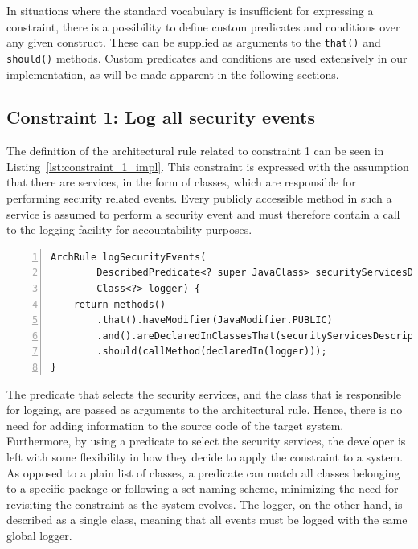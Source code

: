 
In situations where the standard vocabulary is insufficient for expressing a constraint, there is a possibility to define custom predicates and conditions over any given construct. These can be supplied as arguments to the \texttt{that()} and \texttt{should()} methods. Custom predicates and conditions are used extensively in our implementation, as will be made apparent in the following sections.

\subsection{Constraint 1: Log all security events}
The definition of the architectural rule related to constraint 1 can be seen in Listing~\ref{lst:constraint_1_impl}. This constraint is expressed with the assumption that there are services, in the form of classes, which are responsible for performing security related events. Every publicly accessible method in such a service is assumed to perform a security event and must therefore contain a call to the logging facility for accountability purposes.

\begin{minipage}{\linewidth}
\begin{lstlisting}[caption={Rule definition for constraint 1.}, captionpos=b, label=lst:constraint_1_impl, numbers=left]
ArchRule logSecurityEvents(
        DescribedPredicate<? super JavaClass> securityServicesDescriptor,
        Class<?> logger) {
    return methods()
        .that().haveModifier(JavaModifier.PUBLIC)
        .and().areDeclaredInClassesThat(securityServicesDescriptor)
        .should(callMethod(declaredIn(logger)));
}
\end{lstlisting}
\end{minipage}

The predicate that selects the security services, and the class that is responsible for logging, are passed as arguments to the architectural rule. Hence, there is no need for adding information to the source code of the target system. Furthermore, by using a predicate to select the security services, the developer is left with some flexibility in how they decide to apply the constraint to a system. As opposed to a plain list of classes, a predicate can match all classes belonging to a specific package or following a set naming scheme, minimizing the need for revisiting the constraint as the system evolves. The logger, on the other hand, is described as a single class, meaning that all events must be logged with the same global logger.

